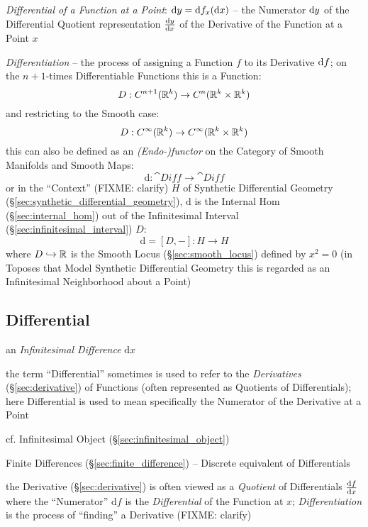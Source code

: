 \emph{Differential of a Function at a Point}:
$\mathrm{d}y = \mathrm{d}f_x(\mathrm{d}x)$ -- the Numerator $\mathrm{d}y$ of the
Differential Quotient representation $\frac{\mathrm{d}y}{\mathrm{d}x}$ of the Derivative of the
Function at a Point $x$

\emph{Differentiation} -- the process of assigning a Function $f$ to its
Derivative $\mathrm{d}f$; on the $n+1$-times Differentiable Functions this is a
Function:
\[
  D : C^{n+1}(\mathbb{R}^k) \rightarrow C^n(\mathbb{R}^k \times \mathbb{R}^k)
\]
and restricting to the Smooth case:
\[
  D : C^\infty(\mathbb{R}^k) \rightarrow C^\infty(\mathbb{R}^k \times \mathbb{R}^k)
\]
this can also be defined as an \emph{(Endo-)functor} on the Category of Smooth
Manifolds and Smooth Maps:
\[
  \mathrm{d} : \cat{Diff} \rightarrow \cat{Diff}
\]
or in the ``Context'' (FIXME: clarify) $H$ of Synthetic Differential Geometry
(\S\ref{sec:synthetic_differential_geometry}), $\mathrm{d}$ is the Internal Hom
(\S\ref{sec:internal_hom}) out of the Infinitesimal Interval
(\S\ref{sec:infinitesimal_interval}) $D$:
\[
  \mathrm{d} = [D,-] : H \rightarrow H
\]
where $D \hookrightarrow \mathbb{R}$ is the Smooth Locus (\S\ref{sec:smooth_locus})
defined by $x^2 = 0$ (in Toposes that Model Synthetic Differential Geometry this
is regarded as an Infinitesimal Neighborhood about a Point)



\subsection{Differential}\label{sec:differential}

an \emph{Infinitesimal Difference} $\mathrm{d}x$

the term ``Differential'' sometimes is used to refer to the \emph{Derivatives}
(\S\ref{sec:derivative}) of Functions (often represented as Quotients of
Differentials); here Differential is used to mean specifically the Numerator of
the Derivative at a Point

\fist cf. Infinitesimal Object (\S\ref{sec:infinitesimal_object})

\fist Finite Differences (\S\ref{sec:finite_difference}) -- Discrete equivalent
of Differentials

\fist the Derivative (\S\ref{sec:derivative}) is often viewed as a
\emph{Quotient} of Differentials $\frac{\mathrm{d}f}{\mathrm{d}x}$ where the ``Numerator''
$\mathrm{d}f$ is the \emph{Differential} of the Function at $x$;
\emph{Differentiation} is the process of ``finding'' a Derivative (FIXME:
clarify)

